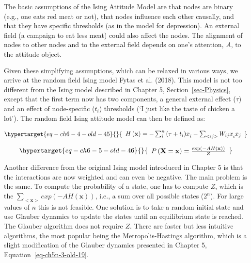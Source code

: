 \documentclass[
  a4paper,
  DIV=11,
  numbers=noendperiod,
  oneside]{scrreprt}
\begin{document}
The basic assumptions of the Ising Attitude Model are that nodes are
binary (e.g., one eats red meat or not), that nodes influence each other
causally, and that they have specific thresholds (as in the model for
depression). An external field (a campaign to eat less meat) could also
affect the nodes. The alignment of nodes to other nodes and to the
external field depends on one's attention, \(A\), to the attitude
object.

Given these simplifying assumptions, which can be relaxed in various
ways, we arrive at the random field Ising model Fytas et al. (2018).
This model is not too different from the Ising model described in
Chapter 5, Section~\ref{sec-Physics}, except that the first term now has
two components, a general external effect (\(\tau\)) and an effect of
node-specific (\(t_{i}\)) thresholds (`I just like the taste of chicken
a lot'). The random field Ising attitude model can then be defined as:

\begin{equation}\protect\hypertarget{eq-ch6-4-old-45}{}{\begin{array}{r}
H\left( \mathbf{x} \right) = - \sum_{i}^{n}{(\tau + {t_{i})x}_{i}} - \sum_{< ij >}^{}{{W_{ij}x}_{i}x_{j}}
\end{array}}\label{eq-ch6-4-old-45}\end{equation}

\begin{equation}\protect\hypertarget{eq-ch6-5-old-46}{}{\begin{array}{r}
P\left( \mathbf{X} = \mathbf{x} \right) = \frac{\exp\left( - AH\left( \mathbf{x} \right) \right)}{Z}
\end{array}}\label{eq-ch6-5-old-46}\end{equation}

Another difference from the original Ising model introduced in Chapter 5
is that the interactions are now weighted and can even be negative. The
main problem is the same. To compute the probability of a state, one has
to compute \(Z\), which is the
\(\sum_{< \mathbf{x} >}^{}{exp( - AH\left( \mathbf{x} \right))}\), i.e.,
a sum over all possible states (\(2^{n}\)). For large values of \(n\)
this is not feasible. One solution is to take a random initial state and
use Glauber dynamics to update the states until an equilibrium state is
reached. The Glauber algorithm does not require \(Z\). There are faster
but less intuitive algorithms, the most popular being the
Metropolis-Hastings algorithm, which is a slight modification of the
Glauber dynamics presented in Chapter 5,
Equation~\ref{eq-ch5n-3-old-19}.
\end{document}
